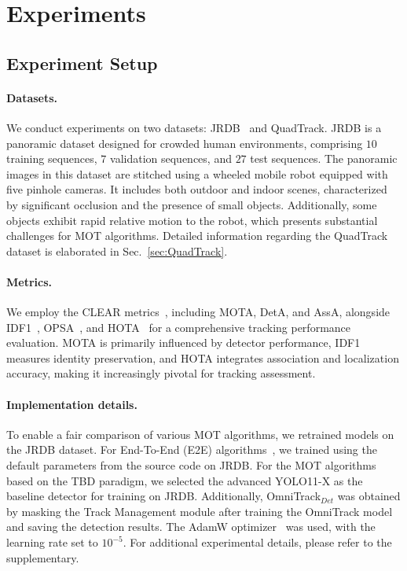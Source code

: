 \section{Experiments }
\label{sec:Experiments}

\subsection{Experiment Setup}





\paragraph{Datasets.}
We conduct experiments on two datasets: JRDB~\cite{martin2021jrdb} and QuadTrack. 
JRDB is a panoramic dataset designed for crowded human environments, comprising $10$ training sequences, $7$ validation sequences, and $27$ test sequences.
The panoramic images in this dataset are stitched using a wheeled mobile robot equipped with five pinhole cameras. It includes both outdoor and indoor scenes, characterized by significant occlusion and the presence of small objects. 
Additionally, some objects exhibit rapid relative motion to the robot, which presents substantial challenges for MOT algorithms. Detailed information regarding the QuadTrack dataset is elaborated in Sec.~\ref{sec:QuadTrack}.

\vspace{-3mm}
\paragraph{Metrics.}
%
We employ the CLEAR metrics~\cite{bernardin2008evaluating}, including MOTA, DetA, and AssA, alongside IDF1~\cite{ristani2016performance}, OPSA~\cite{martin2021jrdb}, and HOTA~\cite{luiten2021hota} for a comprehensive tracking performance evaluation. MOTA is primarily influenced by detector performance, IDF1 measures identity preservation, and HOTA integrates association and localization accuracy, making it increasingly pivotal for tracking assessment.

\vspace{-3mm}
\paragraph{Implementation details.}
To enable a fair comparison of various MOT algorithms, we retrained models on the JRDB dataset. 
For End-To-End (E2E) algorithms~\cite{zhang2023motrv2,meinhardt2021trackformer,zeng2022motr}, we trained using the default parameters from the source code on JRDB. 
For the MOT algorithms~\cite{zhang2022bytetrack,cao2023observation,bewley2016simple,yang2024hybrid} based on the TBD paradigm, we selected the advanced YOLO11-X \cite{yolo11} as the baseline detector for training on JRDB. Additionally, OmniTrack$_{Det}$ was obtained by masking the Track Management module after training the OmniTrack model and saving the detection results. The AdamW optimizer~\cite{kingma2014adam} was used, with the learning rate set to \(10^{-5}\). For additional experimental details, please refer to the supplementary. 
%

